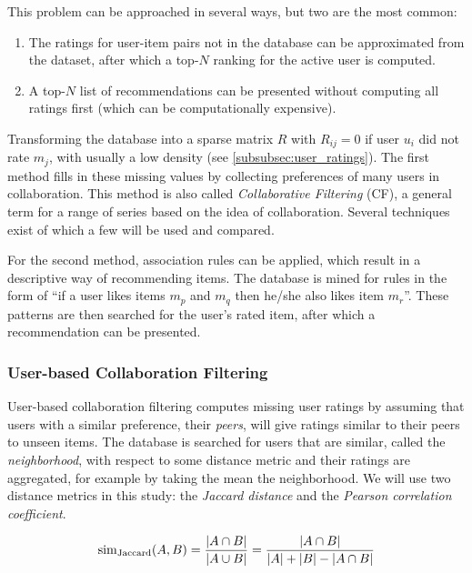 This problem can be approached in several ways, but two are the most common:

\begin{enumerate}
	\item The ratings for user-item pairs not in the database can be approximated from the dataset, after which a top-$N$ ranking for the active user is computed.
	\item A top-$N$ list of recommendations can be presented without computing all ratings first (which can be computationally expensive).
\end{enumerate}

Transforming the database into a sparse matrix $R$ with $R_{ij}=0$ if user $u_i$ did not rate $m_j$, with usually a low density (see \cref{subsubsec:user_ratings}).
The first method fills in these missing values by collecting preferences of many users in collaboration.
This method is also called \emph{Collaborative Filtering} (CF), a general term for a range of series based on the idea of collaboration.
Several techniques exist of which a few will be used and compared.

For the second method, association rules can be applied, which result in a descriptive way of recommending items.
The database is mined for rules in the form of ``if a user likes items $m_p$ and $m_q$ then he/she also likes item $m_r$''.
These patterns are then searched for the user's rated item, after which a recommendation can be presented.




\subsubsection{User-based Collaboration Filtering}

User-based collaboration filtering computes missing user ratings by assuming that users with a similar preference, their \emph{peers}, will give ratings similar to their peers to unseen items.
The database is searched for users that are similar, called the \emph{neighborhood}, with respect to some distance metric and their ratings are aggregated, for example by taking the mean the neighborhood.
We will use two distance metrics in this study: the \emph{Jaccard distance} and the \emph{Pearson correlation coefficient}.

\begin{equation}
	  \mathrm{sim}_{\mathrm{Jaccard}}(A,B) = {{|A \cap B|}\over{|A \cup B|}} = {{|A \cap B|}\over{|A| + |B| - |A \cap B|}}
\end{equation}

